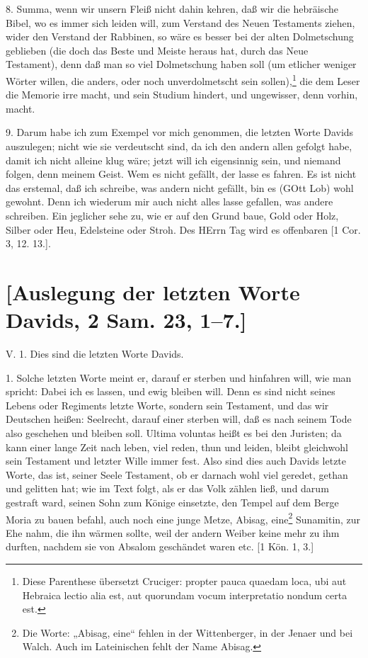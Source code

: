 8. Summa, wenn wir unsern Fleiß nicht dahin kehren, daß wir die hebräische Bibel, wo es immer sich leiden will, zum Verstand des Neuen Testaments ziehen, wider den Verstand der Rabbinen, so wäre es besser bei der alten Dolmetschung geblieben (die doch das Beste und Meiste heraus hat, durch das Neue Testament), denn daß man so viel Dolmetschung haben soll (um etlicher weniger Wörter willen, die anders, oder noch unverdolmetscht sein sollen),\footnote{Diese Parenthese übersetzt Cruciger: propter pauca quaedam loca, ubi aut Hebraica lectio alia est, aut quorundam vocum interpretatio nondum certa est.} die dem Leser die Memorie irre macht, und sein Studium hindert, und ungewisser, denn vorhin, macht.

9. Darum habe ich zum Exempel vor mich genommen, die letzten Worte Davids auszulegen; nicht wie sie verdeutscht sind, da ich den andern allen gefolgt habe, damit ich nicht alleine klug wäre; jetzt will ich eigensinnig sein, und niemand folgen, denn meinem Geist. Wem es nicht gefällt, der lasse es fahren. Es ist nicht das erstemal, daß ich schreibe, was andern nicht gefällt, bin es (GOtt Lob) wohl gewohnt. Denn ich wiederum mir auch nicht alles lasse gefallen, was andere schreiben. Ein jeglicher sehe zu, wie er auf den Grund baue, Gold oder Holz, Silber oder Heu, Edelsteine oder Stroh. Des HErrn Tag wird es offenbaren [1 Cor. 3, 12. 13.].

\section{[Auslegung der letzten Worte Davids, 2 Sam. 23, 1–7.]}

\begin{schriftzitat}
V. 1. Dies sind die letzten Worte Davids.
\end{schriftzitat}

1. Solche letzten Worte meint er, darauf er sterben und hinfahren will, wie man spricht: Dabei ich es lassen, und ewig bleiben will. Denn es sind nicht seines Lebens oder Regiments letzte Worte, sondern sein Testament, und das wir Deutschen heißen: Seelrecht, darauf einer sterben will, daß es nach seinem Tode also geschehen und bleiben soll. Ultima voluntas heißt es bei den Juristen; da kann einer lange Zeit nach leben, viel reden, thun und leiden, bleibt gleichwohl sein Testament und letzter Wille immer fest. Also sind dies auch Davids letzte Worte, das ist, seiner Seele Testament, ob er darnach wohl viel geredet, gethan und gelitten hat; wie im Text folgt, als er das Volk zählen ließ, und darum gestraft ward, seinen Sohn zum Könige einsetzte, den Tempel auf dem Berge Moria zu bauen befahl, auch noch eine junge Metze, Abisag, eine\footnote{Die Worte: „Abisag, eine“ fehlen in der Wittenberger, in der Jenaer und bei Walch. Auch im Lateinischen fehlt der Name Abisag.} Sunamitin, zur Ehe nahm, die ihn wärmen sollte, weil der andern Weiber keine mehr zu ihm durften, nachdem sie von Absalom geschändet waren etc. [1 Kön. 1, 3.]

